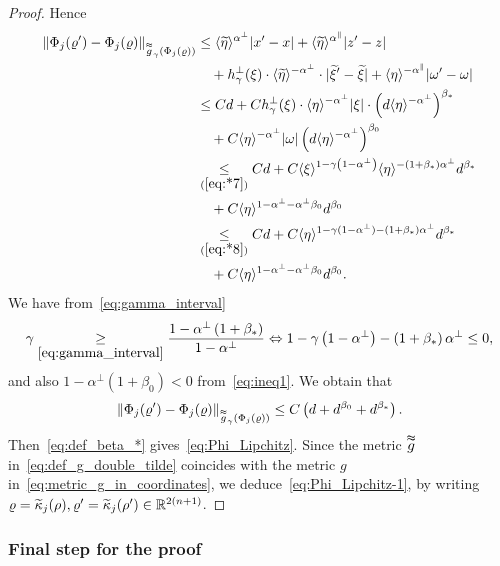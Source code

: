 \documentclass[AHL,Unicode,longabstracts,published]{cedram}
\newcommand*\ineq[1]{\underset{(#1)}{\leq}}
\newcommand{\bbR}{\mathbb{R}}
\let\oldtilde\tilde
\renewcommand*{\tilde}[1]{\mathchoice{\widetilde{#1}}{\widetilde{#1}}{\oldtilde{#1}}{\oldtilde{#1}}}
\newcommand{\bbR}{\mathbb{R}}
\begin{document}
\begin{proof}
Hence
\begin{align*}
\left\|\Phi_{j}(\varrho')-\Phi_{j}(\varrho)\right\|_{\overset{\thickapprox}{g}_{\gamma}\left(\Phi_{j}\left(\varrho\right)\right)} & \le\langle\tilde{\eta}\rangle^{\alpha^{\perp}}|x'-x|+\langle\tilde{\eta}\rangle^{\alpha^{\parallel}}|z'-z|\\
& \quad+h_{\gamma}^{\perp}(\xi)\cdot\langle\tilde{\eta}\rangle^{-\alpha^{\perp}}\cdot|\tilde{\xi}'-\tilde{\xi}|+\langle\eta\rangle^{-\alpha^{\parallel}}|\omega'-\omega|\\
& \le Cd+Ch_{\gamma}^{\perp}(\xi)\cdot\langle\eta\rangle^{-\alpha^{\perp}}|\xi|\cdot\left(d\langle\eta\rangle^{-\alpha^{\perp}}\right)^{\beta_{*}}\\
& \quad+C\langle\eta\rangle^{-\alpha^{\perp}}|\omega|\left(d\langle\eta\rangle^{-\alpha^{\perp}}\right)^{\beta_{0}}\\
& \ineq{\ref{eq:*7}}Cd+C\langle\xi\rangle^{1-\gamma\left(1-\alpha^{\perp}\right)}\langle\eta\rangle^{-\left(1+\beta_{*}\right)\alpha^{\perp}}d^{\beta_{*}}\\
& \quad+C\langle\eta\rangle^{1-\alpha^{\perp}-\alpha^{\perp}\beta_{0}}d^{\beta_{0}}\\
& \ineq{\ref{eq:*8}}Cd+C\langle\eta\rangle^{1-\gamma(1-\alpha^{\perp})-(1+\beta_{*})\alpha^{\perp}}d^{\beta_{*}}\\
& \quad+C\langle\eta\rangle^{1-\alpha^{\perp}-\alpha^{\perp}\beta_{0}}d^{\beta_{0}}.
\end{align*}
We have from~\eqref{eq:gamma_interval}
\begin{align*}
\gamma\underset{\eqref{eq:gamma_interval}}{\geq}\frac{1-\alpha^{\perp}\left(1+\beta_{*}\right)}{1-\alpha^{\perp}}
\Leftrightarrow  1-\gamma\left(1-\alpha^{\perp}\right)-\left(1+\beta_{*}\right)\alpha^{\perp}\leq0,
\end{align*}
and also $1-\alpha^{\perp}(1+\beta_{0})<0$ from~\eqref{eq:ineq1}. We obtain that
\[
\left\|\Phi_{j}(\varrho')-\Phi_{j}(\varrho)\right\|_{\overset{\thickapprox}{g}_{\gamma}\left(\Phi_{j}\left(\varrho\right)\right)}\le C\left(d+d^{\beta_{0}}+d^{\beta_{*}}\right).
\]
Then~\eqref{eq:def_beta_*} gives~\eqref{eq:Phi_Lipchitz}. Since the metric $\overset{\thickapprox}{g}$ in~\eqref{eq:def_g_double_tilde} coincides with the metric $g$ in~\eqref{eq:metric_g_in_coordinates}, we deduce~\eqref{eq:Phi_Lipchitz-1}, by writing $\varrho=\tilde{\kappa}_{j}(\rho),\varrho'=\tilde{\kappa}_{j}(\rho')\in\bbR^{2(n+1)}$.
\end{proof}

\subsubsection{Final step for the proof}
\end{document}
